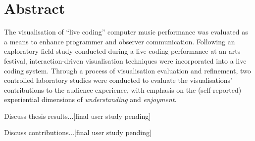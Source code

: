 
\chapter*{Abstract}
\label{chap:abstract}

The visualisation of ``live coding'' computer music performance was evaluated as a means to enhance programmer and observer communication. Following an exploratory field study conducted during a live coding performance at an arts festival, interaction-driven visualisation techniques were incorporated into a live coding system. Through a process of visualisation evaluation and refinement, two controlled laboratory studies were conducted to evaluate the visualisations' contributions to the audience experience, with emphasis on the (self-reported) experiential dimensions of \emph{understanding} and \emph{enjoyment}.

Discuss thesis results...[final user study pending]

Discuss contributions...[final user study pending]
